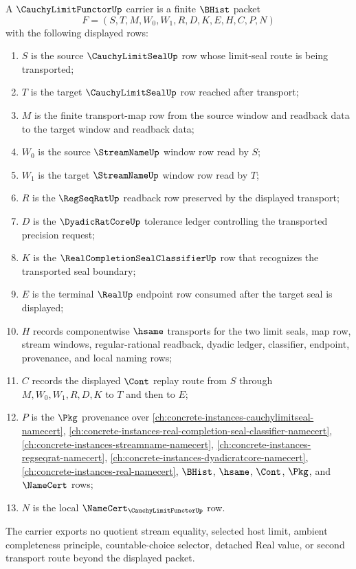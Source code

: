 \begin{definition}
\label{def:cauchy-limit-functor-carrier}
A $\CauchyLimitFunctorUp$ carrier is a finite $\BHist$ packet
$$
F=(S,T,M,W_0,W_1,R,D,K,E,H,C,P,N)
$$
with the following displayed rows:
\begin{enumerate}
\item $S$ is the source $\CauchyLimitSealUp$ row whose limit-seal route is being transported;
\item $T$ is the target $\CauchyLimitSealUp$ row reached after transport;
\item $M$ is the finite transport-map row from the source window and readback data to the target window and readback data;
\item $W_0$ is the source $\StreamNameUp$ window row read by $S$;
\item $W_1$ is the target $\StreamNameUp$ window row read by $T$;
\item $R$ is the $\RegSeqRatUp$ readback row preserved by the displayed transport;
\item $D$ is the $\DyadicRatCoreUp$ tolerance ledger controlling the transported precision request;
\item $K$ is the $\RealCompletionSealClassifierUp$ row that recognizes the transported seal boundary;
\item $E$ is the terminal $\RealUp$ endpoint row consumed after the target seal is displayed;
\item $H$ records componentwise $\hsame$ transports for the two limit seals, map row, stream windows, regular-rational readback, dyadic ledger, classifier, endpoint, provenance, and local naming rows;
\item $C$ records the displayed $\Cont$ replay route from $S$ through $M,W_0,W_1,R,D,K$ to $T$ and then to $E$;
\item $P$ is the $\Pkg$ provenance over \autoref{ch:concrete-instances-cauchylimitseal-namecert}, \autoref{ch:concrete-instances-real-completion-seal-classifier-namecert}, \autoref{ch:concrete-instances-streamname-namecert}, \autoref{ch:concrete-instances-regseqrat-namecert}, \autoref{ch:concrete-instances-dyadicratcore-namecert}, \autoref{ch:concrete-instances-real-namecert}, $\BHist$, $\hsame$, $\Cont$, $\Pkg$, and $\NameCert$ rows;
\item $N$ is the local $\NameCert_{\CauchyLimitFunctorUp}$ row.
\end{enumerate}
The carrier exports no quotient stream equality, selected host limit, ambient completeness principle, countable-choice selector, detached Real value, or second transport route beyond the displayed packet.
\end{definition}

